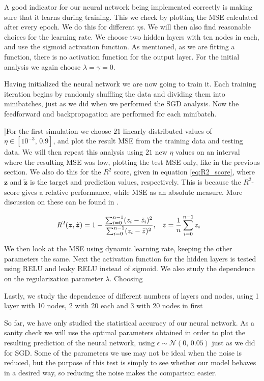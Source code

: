 \documentclass[12pt]{extarticle}
\begin{document}
A good indicator for our neural network being implemented correctly is making sure that it learns during training. This we check by plotting the MSE calculated after every epoch. We do this for different $\eta$s. We will then also find reasonable choices for the learning rate. We choose two hidden layers with ten nodes in each, and use the sigmoid activation function. As mentioned, as we are fitting a function, there is no activation function for the output layer. For the initial analysis we again choose $\lambda=\gamma=0$.

Having initialized the neural network we are now going to train it. Each training iteration begins by randomly shuffling the data and dividing them into minibatches, just as we did when we performed the SGD analysis. Now the feedforward and backpropagation are performed for each minibatch.

|For the first simulation we choose $21$ linearly distributed values of $\eta\in[10^{-3},\,0.9]$, and plot the result MSE from the training data and testing data. We will then repeat this analysis using $21$ new $\eta$ values on an interval where the resulting MSE was low, plotting the test MSE only, like in the previous section. We also do this for the $R^2$ score, given in equation \eqref{eq:R2_score}, where $\boldsymbol{z}$ and $\boldsymbol{\tilde{z}}$ is the target and prediction values, respectively. This is because the $R^2$-score gives a relative performance, while MSE as an absolute measure. More discussion on these can be found in \cite{project1}.

\begin{align} \label{eq:R2_score}
	R^2(\boldsymbol{z}, \boldsymbol{\tilde{z}}) & = 1 - \frac{\sum_{i=0}^{n-1}(z_i - \tilde{z}_i)^2}{\sum_{i=0}^{n-1}(z_i - \bar{z})^2}, \hspace{3mm} \bar{z} = \frac{1}{n}\sum_{i=0}^{n-1}z_i
\end{align}


We then look at the MSE using dynamic learning rate, keeping the other parameters the same. Next the activation function for the hidden layers is tested using RELU and leaky RELU instead of sigmoid. We also study the dependence on the regularization parameter $\lambda$. Choosing

Lastly, we study the dependence of different numbers of layers and nodes, using 1 layer with 10 nodes, 2 with 20 each and 3 with 20 nodes in first


So far, we have only studied the statistical accuracy of our neural network. As a sanity check we will use the optimal parameters obtained in order to plot the resulting prediction of the neural network, using $\epsilon\sim\mathcal{N}(0,\,0.05)$ just as we did for SGD. Some of the parameters we use may not be ideal when the noise is reduced, but the purpose of this test is simply to see whether our model behaves in a desired way, so reducing the noise makes the comparison easier.
\end{document}
